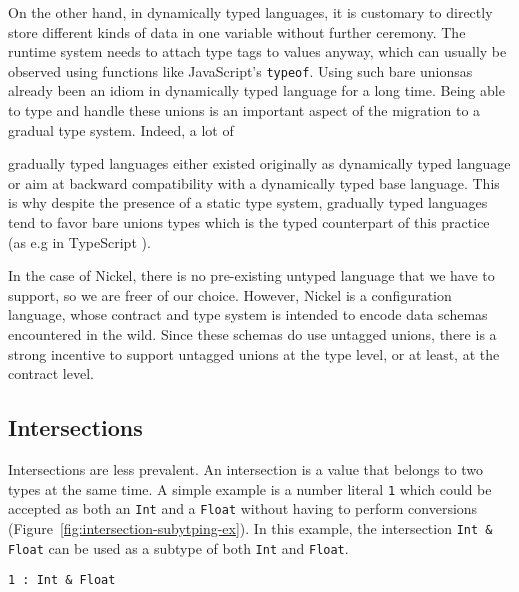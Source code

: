 \documentclass[sigplan,10pt,review,anonymous]{acmart}
\newcommand{\unsure}[2][1=]{}
\newcommand{\resolved}[2]{}
\newcommand{\nickel}[1]{\lstinline[language=nickel]{#1}}
\begin{document}
On the other hand, in dynamically typed languages, it is customary to directly
store different kinds of data in one variable without further ceremony. The
runtime system needs to attach type tags to values anyway, which can usually be
observed using functions like JavaScript's \verb+typeof+. Using such bare
unions\resolved{If you can observe with typeof, then it's pretty much a tagged
union, though the tag is implicit} has already been an idiom in dynamically
typed language for a long time. Being able to type and handle these unions is an
important aspect of the migration to a gradual type system. Indeed, a lot of
\unsure{This is the first time discussing gradual type systems, maybe it should
be introduced earlier, in particular how they relate to contracts 
(I think is mentioned on the appendix)}
gradually typed languages either existed originally as dynamically typed
language or aim at backward compatibility with a dynamically typed base
language. This is why despite the presence of a static type system, gradually
typed languages tend to favor bare unions types which is the typed counterpart
of this practice (as e.g in TypeScript \cite{TypeScriptUnions}).

In the case of Nickel, there is no pre-existing untyped language that we have to
support, so we are freer of our choice. However, Nickel is a configuration
language, whose contract and type system is intended to encode data schemas encountered in the wild. Since these schemas do use
untagged unions, there is a strong incentive to support untagged unions at the
type level, or at least, at the contract level.

\subsection*{Intersections}

Intersections are less prevalent. An intersection is a value that belongs to
two types at the same time. A simple example is a number literal \nickel{1}
which could be accepted as both an \nickel{Int} and a \nickel{Float} without
having to perform conversions (Figure~\ref{fig:intersection-subytping-ex}). In
this example, the intersection \nickel{Int & Float} can be used as a subtype of
both \nickel{Int} and \nickel{Float}.

\label{fig:intersection-subytping-ex}
\begin{lstlisting}[title={Value subtyping}]
1 : Int & Float
\end{lstlisting}
\end{document}
